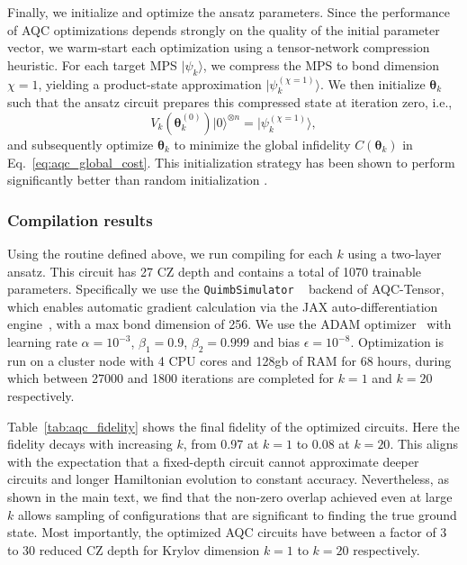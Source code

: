 \documentclass[
  reprint,            %
  amsmath,amssymb,
  aps,
  superscriptaddress, %
  longbibliography
]{revtex4-2}
\theoremstyle{definition}
\begin{document}
Finally, we initialize and optimize the ansatz parameters. Since the performance of AQC optimizations depends strongly on the quality of the initial parameter vector, we warm-start each optimization using a tensor-network compression heuristic. For each target MPS $\lvert \psi_k\rangle$, we compress the MPS to bond dimension $\chi=1$, yielding a product-state approximation $\lvert \psi_k^{(\chi=1)}\rangle$. We then initialize $\boldsymbol{\theta}_k$ such that the ansatz circuit prepares this compressed state at iteration zero, i.e.,
\begin{equation}
V_k(\boldsymbol{\theta}_k^{(0)})\lvert 0\rangle^{\otimes n} = \lvert \psi_k^{(\chi=1)}\rangle,
\end{equation}
and subsequently optimize $\boldsymbol{\theta}_k$ to minimize the global infidelity $C(\boldsymbol{\theta}_k)$ in Eq.~\eqref{eq:aqc_global_cost}. This initialization strategy has been shown to perform significantly better than random initialization \cite{jaderberg2025variational}.

\subsubsection{Compilation results}

Using the routine defined above, we run compiling for each $k$ using a two-layer ansatz. This circuit has 27 CZ depth and contains a total of 1070 trainable parameters. Specifically we use the \texttt{QuimbSimulator} ~\cite{gray2018quimb} backend of AQC-Tensor, which enables automatic gradient calculation via the JAX auto-differentiation engine~\cite{jax2018github}, with a max bond dimension of 256. We use the ADAM optimizer~\cite{kingma2014adam} with learning rate $\alpha=10^{-3}$, $\beta_1=0.9$, $\beta_2=0.999$ and bias $\epsilon=10^{-8}$. Optimization is run on a cluster node with 4 CPU cores and 128gb of RAM for 68 hours, during which between 27000 and 1800 iterations are completed for $k=1$ and $k=20$ respectively.

Table~\ref{tab:aqc_fidelity} shows the final fidelity of the optimized circuits. Here the fidelity decays with increasing $k$, from 0.97 at $k=1$ to 0.08 at $k=20$. This aligns with the expectation that a fixed-depth circuit cannot approximate deeper circuits and longer Hamiltonian evolution to constant accuracy. Nevertheless, as shown in the main text, we find that the non-zero overlap achieved even at large $k$ allows sampling of configurations that are significant to finding the true ground state. Most importantly, the optimized AQC circuits have between a factor of 3 to 30 reduced CZ depth for Krylov dimension $k=1$ to $k=20$ respectively.
\end{document}
